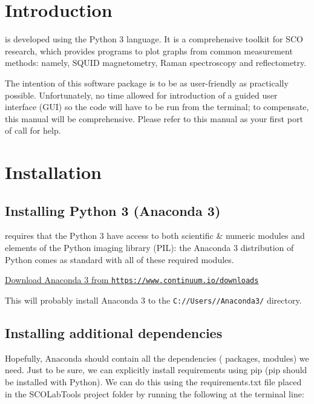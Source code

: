 
\tableofcontents

\pagebreak
\section{Introduction}
\labtools{} is developed using the Python 3 language. It is a comprehensive toolkit for SCO research, which provides programs to plot graphs from common measurement methods: namely, SQUID magnetometry, Raman spectroscopy and reflectometry.

The intention of this software package is to be as user-friendly as practically possible. Unfortunately, no time allowed for introduction of a guided user interface (GUI) so the code will have to be run from the terminal; to compensate, this manual will be comprehensive. Please refer to this manual as your first port of call for help.

\section{Installation}
\subsection{Installing Python 3 (Anaconda 3)}
\labtools{} requires that the Python 3 have access to both scientific \& numeric modules and elements of the Python imaging library (PIL): the Anaconda 3 distribution of Python comes as standard with all of these required modules.

\begin{center}
\colorbox{lighterblue}{%
	\href{https://www.continuum.io/downloads}{Download Anaconda 3 from \texttt{https://www.continuum.io/downloads}}
}
\end{center}%

This will probably install Anaconda 3 to the \texttt{C://Users/\user{}/Anaconda3/} directory.


\subsection{Installing additional dependencies}

Hopefully, Anaconda should contain all the dependencies (\ie{} packages, modules) we need. Just to be sure, we can explicitly install requirements using pip (pip should be installed with Python). We can do this using the requirements.txt file placed in the SCOLabTools project folder by running the following at the terminal line:

